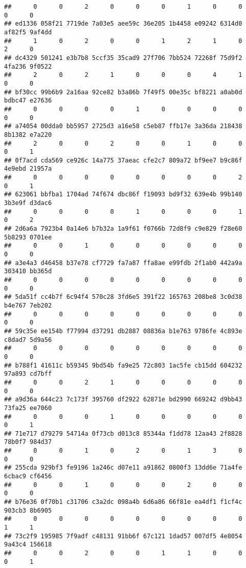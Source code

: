 \documentclass[
]{article}
\begin{document}
\begin{verbatim}
##      0      0      2      0      0      0      1      0      0      0      0 
## ed1336 058f21 7719de 7a03e5 aee59c 36e205 1b4458 e09242 6314d0 af82f5 9af4dd 
##      1      0      2      0      0      1      2      1      0      2      0 
## dc4329 501241 e3b7b8 5ccf35 35cad9 27f706 7bb524 72268f 75d9f2 4fa236 9f0522 
##      2      0      2      1      0      0      0      4      1      0      0 
## bf30cc 99b6b9 2a16aa 92ce82 b3a86b 7f49f5 00e35c bf8221 a0ab0d bdbc47 e27636 
##      0      0      0      0      1      0      0      0      0      0      0 
## a74054 00dda0 bb5957 2725d3 a16e58 c5eb87 ffb17e 3a36da 218438 8b1382 e7a220 
##      2      0      0      2      0      0      1      0      0      0      1 
## 0f7acd cda569 ce926c 14a775 37aeac cfe2c7 809a72 bf9ee7 b9c86f 4e9ebd 21957a 
##      0      0      0      0      0      0      0      0      2      0      1 
## 623061 bbfba1 1704ad 74f674 dbc86f f19093 bd9f32 639e4b 99b140 3b3e9f d3dac6 
##      0      0      0      0      1      0      0      0      1      0      2 
## 2d6a6a 7923b4 0a14e6 b7b32a 1a9f61 f0766b 72d8f9 c9e829 f28e60 5b8293 0701ee 
##      0      0      1      0      0      0      0      0      0      0      0 
## a3e4a3 d46458 b37e78 cf7729 fa7a87 ffa8ae e99fdb 2f1ab0 442a9a 303410 bb365d 
##      0      0      0      0      0      0      0      0      0      0      0 
## 5da51f cc4b7f 6c94f4 570c28 3fd6e5 391f22 165763 208be8 3c0d38 b4e767 7eb202 
##      0      0      0      0      0      0      0      0      0      0      0 
## 59c35e ee154b f77994 d37291 db2887 08836a b1e763 9786fe 4c893e c8dad7 5d9a56 
##      0      0      0      0      0      0      0      0      0      0      0 
## b788f1 41611c b59345 9bd54b fa9e25 72c803 1ac5fe cb15dd 604232 97a893 cd7bff 
##      0      0      2      1      0      0      0      0      0      0      0 
## a9d36a 644c23 7c173f 395760 df2922 62871e bd2990 669242 d9bb43 73fa25 ee7060 
##      0      0      0      1      0      0      0      0      0      0      1 
## 71e717 d79279 54714a 0f73cb d013c8 85344a f1dd78 12aa43 2f8828 78b0f7 984d37 
##      0      0      1      0      2      0      1      3      0      0      0 
## 255cda 929bf3 fe9196 1a246c d07e11 a91862 0800f3 13dd6e 71a4fe 6cbac9 cf6456 
##      0      0      1      0      0      0      2      0      0      0      0 
## b76e36 0f70b1 c31706 c3a2dc 098a4b 6d6a86 66f81e ea4df1 f1cf4c 903cb3 8b6905 
##      0      0      0      0      0      0      0      0      0      1      1 
## 73c2f9 195985 7f9adf c48131 91bb6f 67c121 1dad57 007df5 4e8054 9a43c4 156618 
##      0      0      2      0      0      1      1      0      0      0      1 

\end{verbatim}
\end{document}
